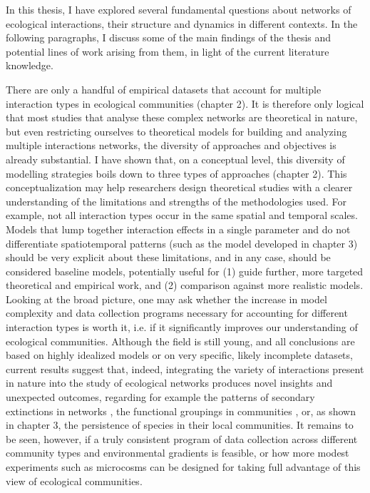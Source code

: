 In this thesis, I have explored several fundamental questions about networks of ecological interactions, their structure and dynamics in different contexts. In the following paragraphs, I discuss some of the main findings of the thesis and potential lines of work arising from them, in light of the current literature knowledge.

There are only a handful of empirical datasets that account for multiple interaction types in ecological communities (chapter 2). It is therefore only logical that most studies that analyse these complex networks are theoretical in nature, but even restricting ourselves to theoretical models for building and analyzing multiple interactions networks, the diversity of approaches and objectives is already substantial. I have shown that, on a conceptual level, this diversity of modelling strategies boils down to three types of approaches (chapter 2). This conceptualization may help researchers design theoretical studies with a clearer understanding of the limitations and strengths of the methodologies used. For example, not all interaction types occur in the same spatial and temporal scales. Models that lump together interaction effects in a single parameter and do not differentiate spatiotemporal patterns (such as the model developed in chapter 3) should be very explicit about these limitations, and in any case, should be considered baseline models, potentially useful for (1) guide further, more targeted theoretical and empirical work, and (2) comparison against more realistic models. Looking at the broad picture, one may ask whether the increase in model complexity and data collection programs necessary for accounting for different interaction types is worth it, i.e. if it significantly improves our understanding of ecological communities. Although the field is still young, and all conclusions are based on highly idealized models or on very specific, likely incomplete datasets, current results suggest that, indeed, integrating the variety of interactions present in nature into the study of ecological networks produces novel insights and unexpected outcomes, regarding for example the patterns of secondary extinctions in networks \citep{Pocock2012,Evans2013a}, the functional groupings in communities \citep{Kefi2016a}, or, as shown in chapter 3, the persistence of species in their local communities. It remains to be seen, however, if a truly consistent program of data collection across different community types and environmental gradients is feasible, or how more modest experiments such as microcosms can be designed for taking full advantage of this view of ecological communities.

